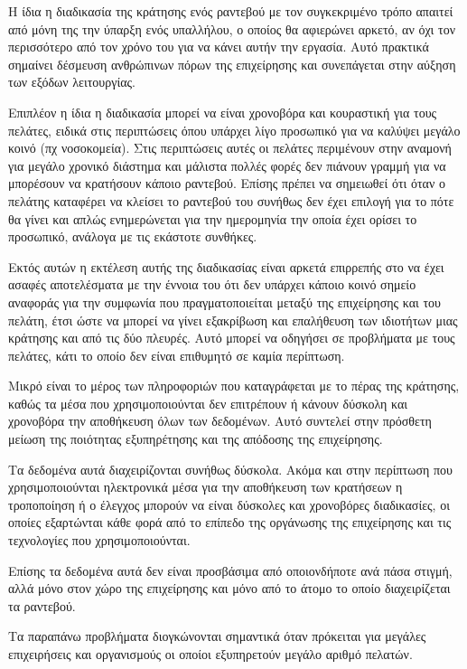 Η  ίδια η διαδικασία της κράτησης ενός ραντεβού με τον συγκεκριμένο τρόπο απαιτεί από μόνη της την ύπαρξη ενός υπαλλήλου, ο οποίος θα αφιερώνει αρκετό, αν όχι τον περισσότερο από τον χρόνο του για να κάνει αυτήν την εργασία. Αυτό πρακτικά σημαίνει δέσμευση ανθρώπινων πόρων της επιχείρησης και συνεπάγεται στην αύξηση των εξόδων λειτουργίας. 

Επιπλέον η ίδια η διαδικασία μπορεί να είναι χρονοβόρα και κουραστική για τους πελάτες, ειδικά στις περιπτώσεις όπου υπάρχει λίγο προσωπικό για να καλύψει μεγάλο κοινό (πχ νοσοκομεία). Στις περιπτώσεις αυτές οι πελάτες περιμένουν στην αναμονή για μεγάλο χρονικό διάστημα και μάλιστα πολλές φορές δεν πιάνουν γραμμή για να μπορέσουν να κρατήσουν κάποιο ραντεβού. Επίσης πρέπει να σημειωθεί ότι όταν ο πελάτης καταφέρει να κλείσει το ραντεβού του συνήθως δεν έχει επιλογή για το πότε θα γίνει και απλώς ενημερώνεται για την ημερομηνία την οποία έχει ορίσει το προσωπικό, ανάλογα με τις εκάστοτε συνθήκες.  

Εκτός αυτών η εκτέλεση αυτής της διαδικασίας είναι αρκετά επιρρεπής στο να έχει ασαφές αποτελέσματα με την έννοια του ότι δεν υπάρχει κάποιο κοινό σημείο αναφοράς για την συμφωνία που πραγματοποιείται μεταξύ της επιχείρησης και του πελάτη, έτσι ώστε να μπορεί να γίνει εξακρίβωση και επαλήθευση των ιδιοτήτων μιας κράτησης και από τις δύο πλευρές. Αυτό μπορεί να οδηγήσει σε προβλήματα με τους πελάτες, κάτι το οποίο δεν είναι επιθυμητό σε καμία περίπτωση.

Μικρό είναι το μέρος των πληροφοριών που καταγράφεται με το πέρας της κράτησης, καθώς τα μέσα που χρησιμοποιούνται δεν επιτρέπουν ή κάνουν δύσκολη και χρονοβόρα την αποθήκευση όλων των δεδομένων. Αυτό συντελεί στην πρόσθετη μείωση της ποιότητας εξυπηρέτησης και της απόδοσης της επιχείρησης.

Τα δεδομένα αυτά διαχειρίζονται συνήθως δύσκολα. Ακόμα και στην περίπτωση που χρησιμοποιούνται ηλεκτρονικά μέσα για την αποθήκευση των κρατήσεων η τροποποίηση ή ο έλεγχος μπορούν να είναι δύσκολες και χρονοβόρες διαδικασίες, οι οποίες εξαρτώνται κάθε φορά από το επίπεδο της οργάνωσης της επιχείρησης και τις τεχνολογίες που χρησιμοποιούνται. 

Επίσης τα δεδομένα αυτά δεν είναι προσβάσιμα από οποιονδήποτε ανά πάσα στιγμή, αλλά μόνο στον χώρο της επιχείρησης και μόνο από το άτομο το οποίο διαχειρίζεται τα ραντεβού. 

Τα παραπάνω προβλήματα διογκώνονται σημαντικά όταν πρόκειται για μεγάλες επιχειρήσεις και οργανισμούς οι οποίοι εξυπηρετούν μεγάλο αριθμό πελατών.

